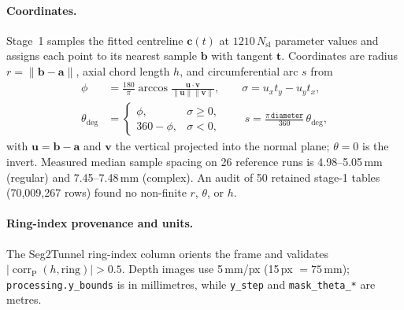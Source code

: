 \documentclass[a4paper,fleqn]{cas-dc}
\begin{document}
\paragraph{Coordinates.}
Stage~1 samples the fitted centreline $\mathbf c(t)$ at $1210\,N_{\mathrm{sl}}$ parameter values and assigns each point to its nearest sample $\mathbf b$ with tangent $\mathbf t$. Coordinates are radius $r=\lVert\mathbf b-\mathbf a\rVert$, axial chord length $h$, and circumferential arc $s$ from
\begin{equation}
\begin{aligned}
\phi&=\frac{180}{\pi}\arccos\frac{\mathbf u\cdot\mathbf v}{\lVert\mathbf u\rVert\lVert\mathbf v\rVert},\qquad
\sigma=u_xt_y-u_yt_x,\\
\theta_{\mathrm{deg}}&=\begin{cases}\phi,&\sigma\ge0,\\360-\phi,&\sigma<0,\end{cases}\qquad
s=\frac{\pi\,\texttt{diameter}}{360}\,\theta_{\mathrm{deg}},
\end{aligned}
\label{eq:theta-convention}
\end{equation}
with $\mathbf u=\mathbf b-\mathbf a$ and $\mathbf v$ the vertical projected into the normal plane; $\theta=0$ is the invert. Measured median sample spacing on 26 reference runs is 4.98--5.05\,mm (regular) and 7.45--7.48\,mm (complex). An audit of 50 retained stage-1 tables (70{,}009{,}267 rows) found no non-finite $r$, $\theta$, or $h$.

\paragraph{Ring-index provenance and units.}
The Seg2Tunnel ring-index column orients the frame and validates $|\operatorname{corr}_{\mathrm P}(h,\text{ring})|>0.5$. Depth images use 5\,mm/px (15\,px $=75$\,mm); \texttt{processing.y\_bounds} is in millimetres, while \texttt{y\_step} and \texttt{mask\_theta\_*} are metres.
\end{document}
